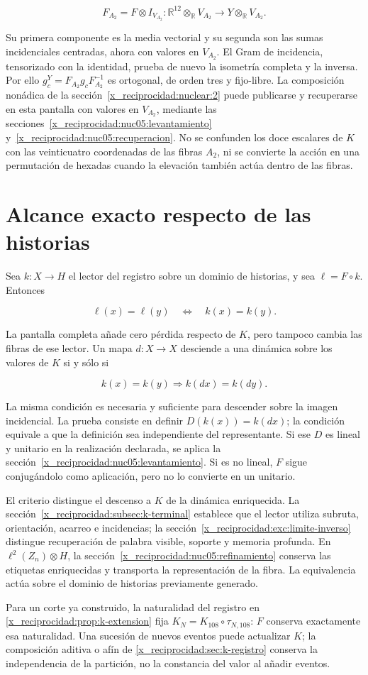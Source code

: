 \[
F_{A_2}=F\otimes I_{V_{A_2}}:
\mathbb R^{12}\otimes_{\mathbb R}V_{A_2}
\longrightarrow Y\otimes_{\mathbb R}V_{A_2}.
\]

Su primera componente es la media vectorial y su segunda son las sumas incidenciales centradas, ahora con valores en \(V_{A_2}\). El Gram de incidencia, tensorizado con la identidad, prueba de nuevo la isometría completa y la inversa. Por ello \(g_c^Y=F_{A_2}g_cF_{A_2}^{-1}\) es ortogonal, de orden tres y fijo-libre. La composición nonádica de la sección~\ref{x_reciprocidad:nuclear:2} puede publicarse y recuperarse en esta pantalla con valores en \(V_{A_2}\), mediante las secciones~\ref{x_reciprocidad:nuc05:levantamiento} y~\ref{x_reciprocidad:nuc05:recuperacion}. No se confunden los doce escalares de \(K\) con las veinticuatro coordenadas de las fibras \(A_2\), ni se convierte la acción en una permutación de hexadas cuando la elevación también actúa dentro de las fibras.

\section{Alcance exacto respecto de las historias}

Sea \(k:X\to H\) el lector del registro sobre un dominio de historias, y sea \(\ell=F\circ k\). Entonces

\[
\ell(x)=\ell(y)\quad\Longleftrightarrow\quad k(x)=k(y).
\]

La pantalla completa añade cero pérdida respecto de \(K\), pero tampoco cambia las fibras de ese lector. Un mapa \(d:X\to X\) desciende a una dinámica sobre los valores de \(K\) si y sólo si

\[
k(x)=k(y)\Longrightarrow k(d x)=k(d y).
\]

La misma condición es necesaria y suficiente para descender sobre la imagen incidencial. La prueba consiste en definir \(D(k(x))=k(dx)\); la condición equivale a que la definición sea independiente del representante. Si ese \(D\) es lineal y unitario en la realización declarada, se aplica la sección~\ref{x_reciprocidad:nuc05:levantamiento}. Si es no lineal, \(F\) sigue conjugándolo como aplicación, pero no lo convierte en un unitario.

El criterio distingue el descenso a \(K\) de la dinámica enriquecida. La sección~\ref{x_reciprocidad:subsec:k-terminal} establece que el lector utiliza subruta, orientación, acarreo e incidencias; la sección~\ref{x_reciprocidad:exc:limite-inverso} distingue recuperación de palabra visible, soporte y memoria profunda. En \(\ell^2(Z_n)\otimes H\), la sección~\ref{x_reciprocidad:nuc05:refinamiento} conserva las etiquetas enriquecidas y transporta la representación de la fibra. La equivalencia actúa sobre el dominio de historias previamente generado.

Para un corte ya construido, la naturalidad del registro en \cref{x_reciprocidad:prop:k-extension} fija \(K_N=K_{108}\circ\tau_{N,108}\): \(F\) conserva exactamente esa naturalidad. Una sucesión de nuevos eventos puede actualizar \(K\); la composición aditiva o afín de \cref{x_reciprocidad:sec:k-registro} conserva la independencia de la partición, no la constancia del valor al añadir eventos.
